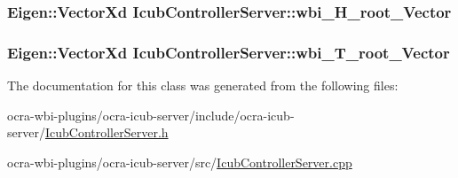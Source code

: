 \hypertarget{classIcubControllerServer_a42f6a8db660da9dbafbc57941b1ee12f}{
\subsubsection[{wbi\-\_\-\-H\-\_\-root\-\_\-\-Vector}]{\setlength{\rightskip}{0pt plus 5cm}\-Eigen\-::\-Vector\-Xd {\bf \-Icub\-Controller\-Server\-::wbi\-\_\-\-H\-\_\-root\-\_\-\-Vector}}}\label{classIcubControllerServer_a42f6a8db660da9dbafbc57941b1ee12f}
\hypertarget{classIcubControllerServer_a818b66e75b7f9457a6a5bcbb3c1306a7}{
\subsubsection[{wbi\-\_\-\-T\-\_\-root\-\_\-\-Vector}]{\setlength{\rightskip}{0pt plus 5cm}\-Eigen\-::\-Vector\-Xd {\bf \-Icub\-Controller\-Server\-::wbi\-\_\-\-T\-\_\-root\-\_\-\-Vector}}}\label{classIcubControllerServer_a818b66e75b7f9457a6a5bcbb3c1306a7}


\-The documentation for this class was generated from the following files\-:\begin{DoxyCompactItemize}
\item 
ocra-\/wbi-\/plugins/ocra-\/icub-\/server/include/ocra-\/icub-\/server/\hyperlink{IcubControllerServer_8h}{\-Icub\-Controller\-Server.\-h}\item 
ocra-\/wbi-\/plugins/ocra-\/icub-\/server/src/\hyperlink{IcubControllerServer_8cpp}{\-Icub\-Controller\-Server.\-cpp}\end{DoxyCompactItemize}

